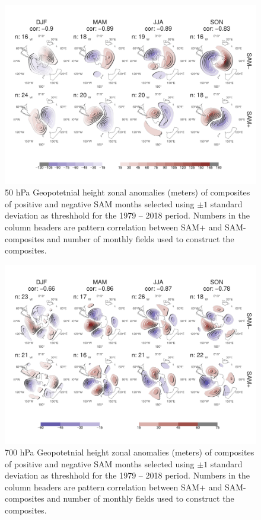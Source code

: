 \documentclass[smallextended]{svjour3}       %
\begin{document}
\begin{figure}
\includegraphics{A3-1} \caption{50 hPa Geopotetnial height zonal anomalies (meters) of composites of positive and negative SAM months selected using $\pm1$ standard deviation as threshhold for the 1979 -- 2018 period. Numbers in the column headers are pattern correlation between SAM+ and SAM- composites and number of monthly fields used to construct the composites.}\label{fig:A3}
\end{figure}

\begin{figure}
\includegraphics{A4-1} \caption{700 hPa Geopotetnial height zonal anomalies (meters) of composites of positive and negative SAM months selected using $\pm1$ standard deviation as threshhold for the 1979 -- 2018 period. Numbers in the column headers are pattern correlation between SAM+ and SAM- composites and number of monthly fields used to construct the composites.}\label{fig:A4}
\end{figure}
\end{document}

